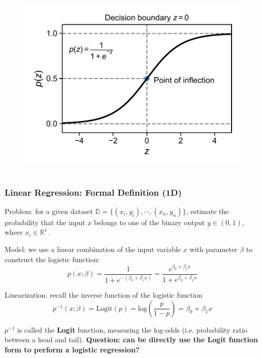 \documentclass[10pt,aspectratio=169]{beamer}
\begin{document}
\begin{frame}
\begin{columns}[T]
\begin{column}{0.5\textwidth}
        \begin{figure}[t]%
          \hspace*{-0.1\textwidth}%
          \includegraphics[width=1.2\textwidth]{scripts/logistic_fun_alone.pdf}
        \end{figure}
        
      \end{column}
      
    \end{columns}
  \end{frame}

  \begin{frame}
    \frametitle{Linear Regression: Formal Definition (1D)}
    Problem: for a given dataset
    $\mathbb{D} = \{(x_{i}, y_{i}), \cdots, (x_{n}, y_{n})\}$,
    estimate the probability that the input $x$ belongs to one of the
    binary output $y \in (0, 1)$, where $x_{i} \in \mathbb{R}^{1}$.

    \vfill Model: we use a linear combination of the input variable
    $x$ with parameter $\beta$ to construct the logistic function:
    \begin{equation*}
      p(x; \beta) = \dfrac{1}{1 + e^{-(\beta_{0} + \beta_{1} x)}} = \dfrac{e^{\beta_{0} + \beta_{1} x}}{1 + e^{\beta_{0} + \beta_{1} x}}
    \end{equation*}

    \vfill Linearization: recall the inverse function of the logistic
    function
    \begin{equation*}
      p^{-1}(x; \beta) = \mathrm{Logit}(p) = \mathrm{log} (\dfrac{p}{1 - p} ) = \beta_{0} + \beta_{1} x
    \end{equation*}

    $p^{-1}$ is called the \textbf{Logit} function, measuring the
    log-odds (i.e. probability ratio between a head and tail). %
    \vfill%
    \textbf{Question: can be directly use the Logit function form to perform a
    logistic regression?}
  
  \end{frame}
\end{document}
